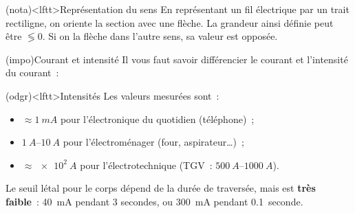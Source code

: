 \documentclass[../../main/main.tex]{subfiles}
\begin{document}
\begin{tcb*}[label=nota:intensconv, sidebyside, righthand
		ratio=.4](nota)<lftt>{Représentation du sens}
	En représentant un fil électrique par un trait rectiligne, on oriente la
	section avec une flèche. La grandeur ainsi définie peut être $\lessgtr 0$. Si
	on la flèche dans l'autre sens, sa valeur est opposée.
	\tcblower
	\begin{center}
	\end{center}
\end{tcb*}
\begin{tcb*}[label=impo:courantintensité](impo){Courant et intensité}
	Il vous faut savoir différencier le courant et l'intensité du courant~:
	\smallbreak
	\begin{isd}[cnt]
		\vspace*{-10pt}
		\tcblower
		\vspace*{-10pt}
	\end{isd}
\end{tcb*}
\begin{tcb*}[label=odgr:intensité](odgr)<lftt>{Intensités}
	Les valeurs mesurées sont~:
	\begin{itemize}
		\item $\approx \SI{1}{mA}$ pour l'électronique du quotidien
		      (téléphone)~;
		\item $\SIrange{1}{10}{A}$ pour l'électroménager (four,
		      aspirateur…)~;
		\item $\approx \SI{e2}{A}$ pour l'électrotechnique (TGV~:
		      $\SIrange{500}{1000}{A}$).
	\end{itemize}
	Le seuil létal pour le corps dépend de la durée de traversée, mais est
	\textbf{très faible}~: \SI{40}{mA} pendant 3 secondes, ou \SI{300}{mA}
	pendant \SI{0.1}{seconde}.
\end{tcb*}
\end{document}
